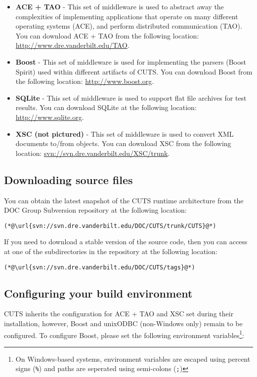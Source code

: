 \begin{itemize} 
  \item \textbf{ACE + TAO} - This set of middleware is used to abstract away the 
  complexities of implementing applications that operate on many different operating
  systems (ACE), and perform distributed communication (TAO). You can download ACE + TAO
  from the following location: \url{http://www.dre.vanderbilt.edu/TAO}.

  \item \textbf{Boost} - This set of middleware is used for implementing the parsers 
  (Boost Spirit) used within different artifacts of CUTS. You can download Boost from
  the following location: \url{http://www.boost.org}.

  \item \textbf{SQLite} - This set of middleware is used to support flat file archives
  for test results. You can download SQLite at the following location: 
  \url{http://www.sqlite.org}.

  \item \textbf{XSC (not pictured)} - This set of middleware is used to convert 
  XML documents to/from objects. You can download XSC from the following location: 
  \url{svn://svn.dre.vanderbilt.edu/XSC/trunk}.
\end{itemize}

\subsection{Downloading source files}
\label{sec:install-download-runtime}

You can obtain the latest snapshot of the CUTS runtime architecture from the
DOC Group Subversion repository at the following location:
\begin{lstlisting}
(*@\url{svn://svn.dre.vanderbilt.edu/DOC/CUTS/trunk/CUTS}@*)
\end{lstlisting}
If you need to download a stable version of the source code, then you can 
access at one of the subdirectories in the repository at the following location:
\begin{lstlisting}
(*@\url{svn://svn.dre.vanderbilt.edu/DOC/CUTS/tags}@*)
\end{lstlisting}

\subsection{Configuring your build environment}

CUTS inherits the configuration for ACE + TAO and XSC set during their installation,
however, Boost and unixODBC (non-Windows only) remain to be configured. To configure
Boost, please set the following environment variables\footnote{On Windows-based systems,
environment variables are escaped using percent signs (\texttt{\%}) and paths are 
seperated using semi-colons (\texttt{;})}:

